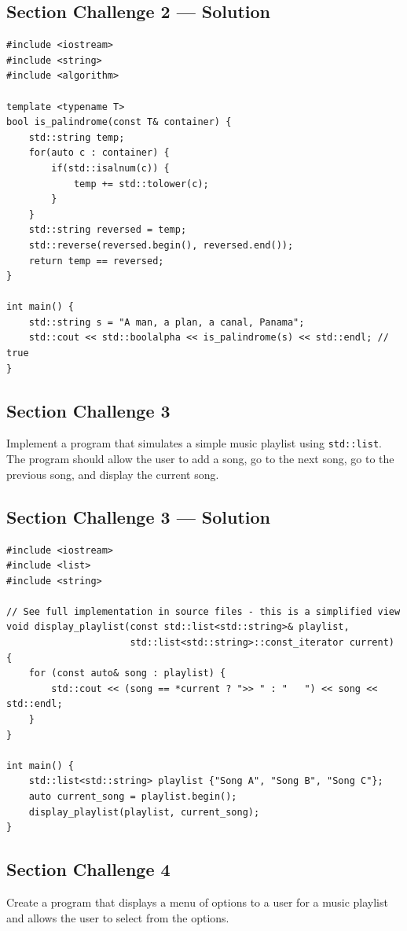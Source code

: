 \subsection{Section Challenge 2 --- Solution}
\begin{lstlisting}
#include <iostream>
#include <string>
#include <algorithm>

template <typename T>
bool is_palindrome(const T& container) {
	std::string temp;
	for(auto c : container) {
		if(std::isalnum(c)) {
			temp += std::tolower(c);
		}
	}
	std::string reversed = temp;
	std::reverse(reversed.begin(), reversed.end());
	return temp == reversed;
}

int main() {
	std::string s = "A man, a plan, a canal, Panama";
	std::cout << std::boolalpha << is_palindrome(s) << std::endl; // true
}
\end{lstlisting}

\subsection{Section Challenge 3}
Implement a program that simulates a simple music playlist using \texttt{std::list}. The program should allow the user to add a song, go to the next song, go to the previous song, and display the current song.

\subsection{Section Challenge 3 --- Solution}
\begin{lstlisting}
#include <iostream>
#include <list>
#include <string>

// See full implementation in source files - this is a simplified view
void display_playlist(const std::list<std::string>& playlist,
                      std::list<std::string>::const_iterator current) {
	for (const auto& song : playlist) {
		std::cout << (song == *current ? ">> " : "   ") << song << std::endl;
	}
}

int main() {
	std::list<std::string> playlist {"Song A", "Song B", "Song C"};
	auto current_song = playlist.begin();
	display_playlist(playlist, current_song);
}
\end{lstlisting}

\subsection{Section Challenge 4}
Create a program that displays a menu of options to a user for a music playlist and allows the user to select from the options.

